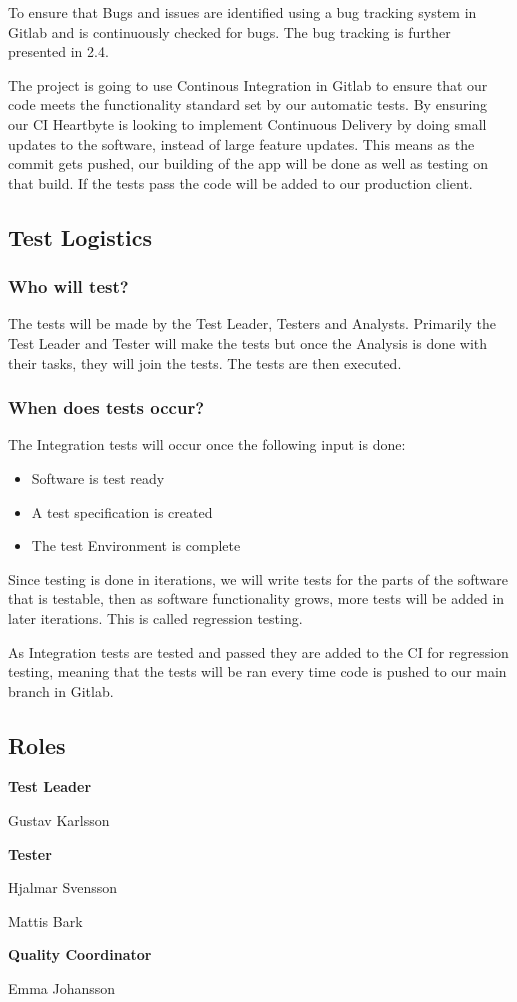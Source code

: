 To ensure that Bugs and issues are identified using a bug tracking system in Gitlab and is continuously checked for bugs. The bug tracking is further presented in 2.4.

The project is going to use Continous Integration in Gitlab to ensure that our code meets the functionality standard set by our automatic tests. By ensuring our CI Heartbyte is looking to implement Continuous Delivery by doing small updates to the software, instead of large feature updates. This means as the commit gets pushed, our building of the app will be done as well as testing on that build. If the tests pass the code will be added to our production client. 
\subsection{Test Logistics}
\subsubsection{Who will test?}
The tests will be made by the Test Leader, Testers and Analysts. Primarily the Test Leader and Tester will make the tests but once the Analysis is done with their tasks, they will join the tests. The tests are then executed.
\subsubsection{When does tests occur?}
The Integration tests will occur once the following input is done:
\begin{itemize}
    \item Software is test ready
    \item A test specification is created
    \item The test Environment is complete
\end{itemize}
Since testing is done in iterations, we will write tests for the parts of the software that is testable, then as software functionality grows, more tests will be added in later iterations. This is called regression testing.

As Integration tests are tested and passed they are added to the CI for regression testing, meaning that the tests will be ran every time code is pushed to our main branch in Gitlab.
\subsection{Roles}
\begin{flushleft}
   \textbf{Test Leader}
    
    
    Gustav Karlsson
  
   \textbf{Tester}
   
    Hjalmar Svensson
    
    Mattis Bark
   
   
   \textbf{Quality Coordinator}
   
    Emma Johansson
     

\end{flushleft}


\clearpage